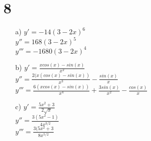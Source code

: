 \documentclass{article}
\begin{document}
\section*{8}
\begin{itemize}
    \item[a) ] $y' = - 14(3-2x)^6$ \\ $y'' = 168(3-2x)^5$ \\ $y''' = -1680(3-2x)^4$
    \item[b) ] $y' = \frac{x cos(x) - sin(x)}{x^2}$ \\
               $y'' = \frac{2(x(cos(x) - sin(x))}{x^3} - \frac{sin(x)}{x}$ \\
               $y''' = \frac{6(x cos(x) - sin(x))}{x^4} + \frac{3 sin(x)}{x^2}- \frac{cos (x)}{x}$
    \item[c) ] $y' = \frac{5 x^2 + 3}{2 \sqrt{x}}$ \\
               $y'' = \frac{3(5x^2-1)}{4x^{3/2}}$ \\
               $y''' = \frac{3(5x^2+3}{8x^{5/2}}$
\end{itemize}
\end{document}
